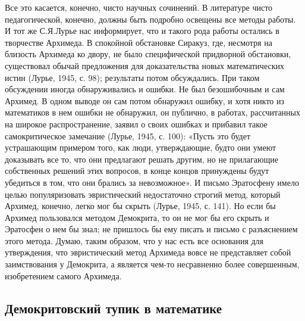 Все это касается, конечно, чисто научных сочинений. В литературе чисто
педагогической, конечно, должны быть подробно освещены все методы
работы. И тот же С.Я.Лурье нас информирует, что и такого рода работы
остались в творчестве Архимеда. В спокойной обстановке Сиракуз, где,
несмотря на близость Архимеда ко двору, не было специфической
придворной обстановки, существовал обычай предложения для
доказательства новых математических истин (Лурье, 1945, с. 98);
результаты потом обсуждались. При таком обсуждении иногда
обнаруживались и ошибки. Не был безошибочным и сам Архимед. В одном
выводе он сам потом обнаружил ошибку, и хотя никто из математиков в
нем ошибки не обнаружил, он публично, в работах, рассчитанных на
широкое распространение, заявил о своих ошибках и прибавил такое
самокритическое замечание (Лурье, 1945, с. 100): «Пусть это будет
устрашающим примером того, как люди, утверждающие, будто они умеют
доказывать все то, что они предлагают решать другим, но не прилагающие
собственных решений этих вопросов, в конце концов принуждены будут
убедиться в том, что они брались за невозможное». И письмо Эратосфену
имело целью популяризовать эвристический недостаточно строгий метод,
который Архимед, конечно, легко мог бы скрыть (Лурье, 1945, с. 141).
Но если бы Архимед пользовался методом Демокрита, то он не мог бы его
скрыть и Эратосфен о нем бы знал; не пришлось бы ему писать и письмо с
разъяснением этого метода. Думаю, таким образом, что у нас есть все
основания для утверждения, что эвристический метод Архимеда вовсе не
представляет собой заимствования у Демокрита, а является чем-то
несравненно более совершенным, изобретением самого Архимеда.

\subsection{Демокритовский тупик в математике}

